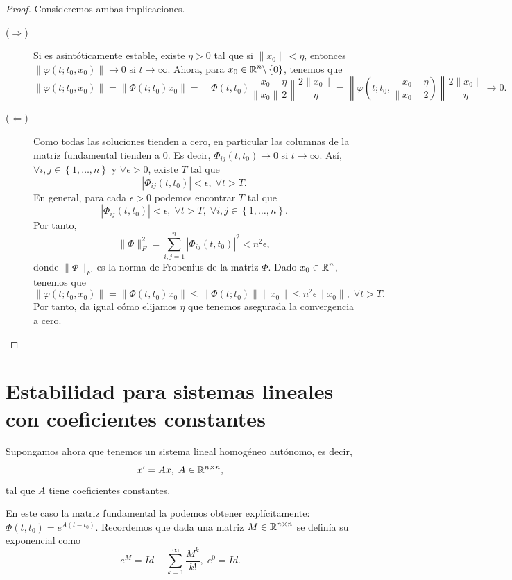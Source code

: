 \begin{proof}
Consideremos ambas implicaciones.
\begin{description}
\item[($\displaystyle \Rightarrow $)] Si es asintóticamente estable, existe $\displaystyle \eta > 0 $ tal que si $\displaystyle \|x_{0}\| < \eta  $, entonces $\displaystyle \|\varphi\left(t; t_{0}, x_{0}\right)\| \to 0$ si $\displaystyle t \to \infty  $. 
	Ahora, para $\displaystyle x_{0} \in \mathbb{R}^{n} \backslash \left\{ 0\right\}  $, tenemos que 
	\[ \|\varphi\left(t; t_{0}, x_{0}\right)\| = \|\Phi\left(t; t_{0}\right)x_{0}\| = \left\|\Phi\left(t, t_{0}\right)\frac{x_{0}}{\|x_{0}\|}\frac{\eta }{2}\right\| \frac{2\|x_{0}\|}{\eta} = \left\|\varphi\left(t; t_{0}, \frac{x_{0}}{\|x_{0}\|} \frac{\eta }{2}\right)\right\| \frac{2\|x_{0}\|}{\eta}\to 0.\]
\item[($\displaystyle \Leftarrow $)] Como todas las soluciones tienden a cero, en particular las columnas de la matriz fundamental tienden a 0. Es decir, $\displaystyle \Phi_{ij}\left(t, t_{0}\right)\to 0 $ si $\displaystyle t \to \infty  $. Así, $\displaystyle \forall i,j \in \left\{ 1, \ldots, n\right\}  $ y $\displaystyle \forall \epsilon > 0 $, existe $\displaystyle T$ tal que 
	\[ \left|\Phi_{ij}\left(t, t_{0}\right)\right|<\epsilon, \; \forall t > T .\]
En general, para cada $\displaystyle \epsilon > 0 $ podemos encontrar $\displaystyle T $ tal que 
\[ \left|\Phi_{ij}\left(t, t_{0}\right)\right|<\epsilon, \; \forall t > T, \; \forall i,j \in \left\{ 1, \ldots, n\right\}  .\]
Por tanto, 
\[ \|\Phi\|_{F}^{2} = \sum^{n}_{i,j = 1} \left|\Phi_{ij}\left(t, t_{0}\right)\right|^{2} < n^{2}\epsilon  ,\]
donde $\displaystyle \|\Phi\|_{F} $ es la norma de Frobenius de la matriz $\displaystyle \Phi $. Dado $\displaystyle x_{0} \in \mathbb{R}^{n} $, tenemos que 
\[ \|\varphi\left(t; t_{0}, x_{0}\right)\| = \|\Phi\left(t, t_{0}\right)x_{0}\| \leq \|\Phi\left(t; t_{0}\right)\| \|x_{0}\| \leq n^{2}\epsilon \|x_{0}\|, \; \forall t > T .\]
Por tanto, da igual cómo elijamos $\displaystyle \eta  $ que tenemos asegurada la convergencia a cero. 
\end{description}
\end{proof}
\section{Estabilidad para sistemas lineales con coeficientes constantes}
\noindent Supongamos ahora que tenemos un sistema lineal homogéneo autónomo, es decir,
\[x' = Ax, \; A \in \mathbb{R}^{n \times n} ,\]
tal que $\displaystyle A $ tiene coeficientes constantes. 
\begin{observation}[Recordatorio]
En este caso la matriz fundamental la podemos obtener explícitamente: $\displaystyle \Phi\left(t, t_{0}\right)=e^{A\left(t-t_{0}\right)} $. Recordemos que dada una matriz $\displaystyle M \in \mathbb{R}^{n \times n} $ se definía su exponencial como
\[e^{M} = Id + \sum^{\infty}_{k = 1}\frac{M^{k}}{k!}, \; e^{0}= Id .\]
\end{observation}

